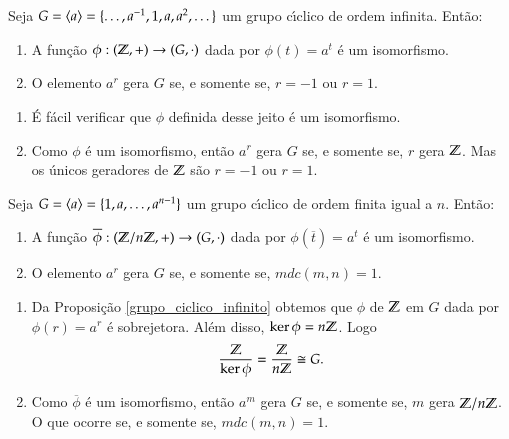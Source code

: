 \begin{proposicao}
	Seja $G = \langle{a}\rangle = \{\dots, a^{-1}, 1, a, a^2, \dots\}$ um grupo c{\'\i}clico de ordem infinita. Ent\~ao:
	\begin{enumerate}[label=({\roman*})]
		\item A fun\c{c}\~ao $\phi: (\mathbb{Z}, +) \to (G, \cdot)$ dada por $\phi(t) = a^t$ \'e um isomorfismo.

		\item O elemento $a^r$ gera $G$ se, e somente se, $r = -1$ ou $r = 1$.
	\end{enumerate}
\end{proposicao}
\begin{prova}
	\begin{prova}
		\begin{enumerate}[label=({\roman*})]
			\item \'E f\'acil verificar que $\phi$ definida desse jeito \'e um isomorfismo.

			\item Como $\phi$ \'e um isomorfismo, ent\~ao $a^r$ gera $G$ se, e somente se, $r$ gera $\mathbb{Z}$. Mas os \'unicos geradores de $\mathbb{Z}$ s\~ao $r = -1$ ou $r = 1$.
		\end{enumerate}
	\end{prova}
\end{prova}

\begin{proposicao}\label{grupo_ciclico_infinito}
	Seja $G = \langle{a}\rangle = \{1, a, \dots, a^{n - 1}\}$ um grupo c{\'\i}clico de ordem finita igual a $n$. Ent\~ao:
	\begin{enumerate}[label=({\roman*})]
		\item A fun\c{c}\~ao $\overline{\phi}: (\mathbb{Z}/n\mathbb{Z}, +) \to (G, \cdot)$ dada por $\phi(\overline{t}) = a^t$ \'e um isomorfismo.

		\item O elemento $a^r$ gera $G$ se, e somente se, $mdc(m,n) = 1$.
	\end{enumerate}
\end{proposicao}
\begin{prova}
	\begin{enumerate}[label=({\roman*})]
		\item Da Proposi\c{c}\~ao \ref{grupo_ciclico_infinito} obtemos que $\phi$ de $\mathbb{Z}$ em $G$ dada por $\phi(r) = a^r$ \'e sobrejetora. Al\'em disso, $\ker\phi = n\mathbb{Z}$. Logo
		\[
			\dfrac{\mathbb{Z}}{\ker\phi} = \dfrac{\mathbb{Z}}{n\mathbb{Z}} \cong G.
		\]

		\item Como $\overline{\phi}$ \'e um isomorfismo, ent\~ao $a^m$ gera $G$ se, e somente se, $m$ gera $\mathbb{Z}/n\mathbb{Z}$. O que ocorre se, e somente se, $mdc(m,n) = 1$.
	\end{enumerate}
\end{prova}

